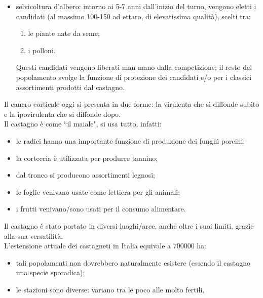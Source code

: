 \begin{itemize}[nosep]
    Tutte le operazioni vanno terminate entro i 20 anni di età, perché il castagno (come tutte le fagacee ad esclusione del faggio), in condizione di stress tende ad emettere rami epicornici (falsi polloni sulla chioma), che riducono la qualità del legname. Prima dei 20 anni, la ceppaia risponde allo stress emettendo polloni, dopo i 20 anni emettendo rami epicornici.\\
    Dopo i 20 anni da inizio del turno, si aspetta il raggiungimento del diametro obiettivo, e poi si effettua il taglio.
    \item selvicoltura d'albero: intorno ai 5-7 anni dall'inizio del turno, vengono eletti i candidati (al massimo 100-150 ad ettaro, di elevatissima qualità), scelti tra:
    \begin{enumerate}[nosep]
        \item le piante nate da seme;
        \item i polloni.
    \end{enumerate} 
    Questi candidati vengono liberati man mano dalla competizione; il resto del popolamento svolge la funzione di protezione dei candidati e/o per i classici assortimenti prodotti dal castagno. 
\end{itemize}
Il cancro corticale oggi si presenta in due forme: la virulenta che si diffonde subito e la ipovirulenta che si diffonde dopo.\\
Il castagno è come ``il maiale", si usa tutto, infatti:
\begin{itemize}[nosep]
    \item le radici hanno una importante funzione di produzione dei funghi porcini;
    \item la corteccia è utilizzata per produrre tannino;
    \item dal tronco si producono assortimenti legnosi;
    \item le foglie venivano usate come lettiera per gli animali;
    \item i frutti venivano/sono usati per il consumo alimentare.
\end{itemize}
Il castagno è stato portato in diversi luoghi/aree, anche oltre i suoi limiti, grazie alla sua versatilità.\\
L'estensione attuale dei castagneti in Italia equivale a 700000 ha:
\begin{itemize}[nosep]
    \item tali popolamenti non dovrebbero naturalmente esistere (essendo il castagno una specie sporadica);
    \item le stazioni sono diverse: variano tra le poco alle molto fertili.
\end{itemize}
